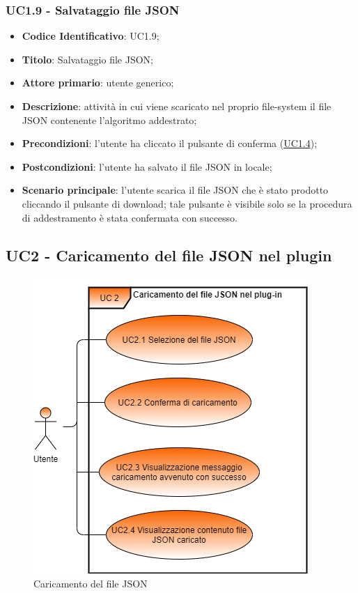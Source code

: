 	\label{par:UC1.9}
	\subsubsection{UC1.9 - Salvataggio file JSON}
		\begin{itemize}
			\item\textbf{Codice Identificativo}: UC1.9;
			\item\textbf{Titolo}: Salvataggio file JSON;
			\item\textbf{Attore primario}: utente generico;
			\item\textbf{Descrizione}: attività in cui viene scaricato nel proprio file-system il file JSON contenente l'algoritmo addestrato;
			\item\textbf{Precondizioni}: l'utente ha cliccato il pulsante di conferma (\hyperref[par:UC1.4]{UC1.4});
			\item\textbf{Postcondizioni}: l'utente ha salvato il file JSON in locale;
			\item\textbf{Scenario principale}: l'utente scarica il file JSON che è stato prodotto cliccando il pulsante di download; tale pulsante è visibile solo se la procedura di addestramento è stata confermata con successo. 	
			
			 	
		\end{itemize}


	\label{par:UC2}
	\subsection{UC2 - Caricamento del file JSON nel plugin}
	

\begin{figure}[H]
		\centering
		\includegraphics[scale=0.60]{../Analisi_dei_requisiti/img/Diagrammi_UML/UC2_Caricamento_file_JSON_nel_plug-in}
		\caption{Caricamento del file JSON}
	\end{figure}	
	
